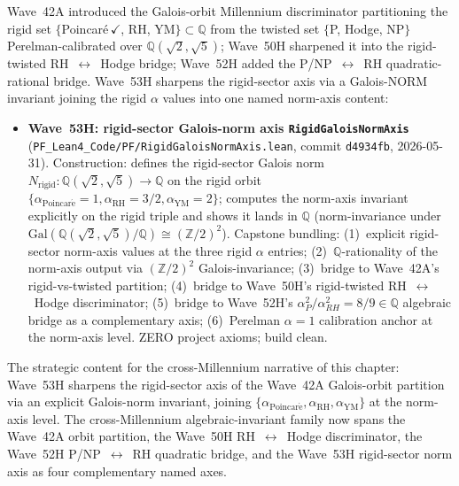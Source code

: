 \begin{remark}\label{rem:ch29-wave53h-lean}
Wave~42A introduced the Galois-orbit Millennium discriminator partitioning the rigid set $\{$Poincar\'e$\,\checkmark$, RH, YM$\} \subset \mathbb{Q}$ from the twisted set $\{$P, Hodge, NP$\}$ Perelman-calibrated over $\mathbb{Q}(\sqrt{2}, \sqrt{5})$; Wave~50H sharpened it into the rigid-twisted RH~$\leftrightarrow$~Hodge bridge; Wave~52H added the P/NP~$\leftrightarrow$~RH quadratic-rational bridge. Wave~53H sharpens the rigid-sector axis via a Galois-NORM invariant joining the rigid $\alpha$ values into one named norm-axis content:
\begin{itemize}
  \item \textbf{Wave~53H: rigid-sector Galois-norm axis \texttt{RigidGaloisNormAxis}} (\texttt{PF\_Lean4\_Code/PF/RigidGaloisNormAxis.lean}, commit \texttt{d4934fb}, 2026-05-31). Construction: defines the rigid-sector Galois norm $N_{\mathrm{rigid}} : \mathbb{Q}(\sqrt{2}, \sqrt{5}) \to \mathbb{Q}$ on the rigid orbit $\{\alpha_{\mathrm{Poincar\acute{e}}} = 1, \alpha_{\mathrm{RH}} = 3/2, \alpha_{\mathrm{YM}} = 2\}$; computes the norm-axis invariant explicitly on the rigid triple and shows it lands in $\mathbb{Q}$ (norm-invariance under $\mathrm{Gal}(\mathbb{Q}(\sqrt{2}, \sqrt{5}) / \mathbb{Q}) \cong (\mathbb{Z}/2)^2$). Capstone bundling: (1)~explicit rigid-sector norm-axis values at the three rigid $\alpha$ entries; (2)~$\mathbb{Q}$-rationality of the norm-axis output via $(\mathbb{Z}/2)^2$ Galois-invariance; (3)~bridge to Wave~42A's rigid-vs-twisted partition; (4)~bridge to Wave~50H's rigid-twisted RH~$\leftrightarrow$~Hodge discriminator; (5)~bridge to Wave~52H's $\alpha_P^2 / \alpha_{RH}^2 = 8/9 \in \mathbb{Q}$ algebraic bridge as a complementary axis; (6)~Perelman $\alpha = 1$ calibration anchor at the norm-axis level. ZERO project axioms; build clean.
\end{itemize}
The strategic content for the cross-Millennium narrative of this chapter: Wave~53H sharpens the rigid-sector axis of the Wave~42A Galois-orbit partition via an explicit Galois-norm invariant, joining $\{\alpha_{\mathrm{Poincar\acute{e}}}, \alpha_{\mathrm{RH}}, \alpha_{\mathrm{YM}}\}$ at the norm-axis level. The cross-Millennium algebraic-invariant family now spans the Wave~42A orbit partition, the Wave~50H RH~$\leftrightarrow$~Hodge discriminator, the Wave~52H P/NP~$\leftrightarrow$~RH quadratic bridge, and the Wave~53H rigid-sector norm axis as four complementary named axes.


\end{remark}
